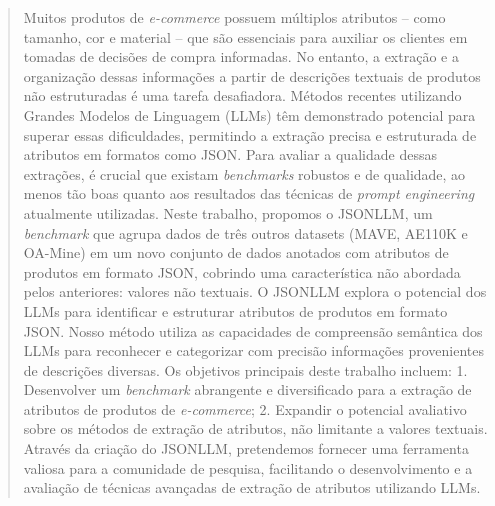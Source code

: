 



\maketitle




\begin{abstract} %
  Muitos produtos de \textit{e-commerce} possuem múltiplos atributos -- como tamanho, cor e material -- que são essenciais para auxiliar os clientes em tomadas de decisões de compra informadas. No entanto, a extração e a organização dessas informações a partir de descrições textuais de produtos não estruturadas é uma tarefa desafiadora. Métodos recentes utilizando Grandes Modelos de Linguagem (LLMs) têm demonstrado potencial para superar essas dificuldades, permitindo a extração precisa e estruturada de atributos em formatos como JSON. Para avaliar a qualidade dessas extrações, é crucial que existam \textit{benchmarks} robustos e de qualidade, ao menos tão boas quanto aos resultados das técnicas de \textit{prompt engineering} atualmente utilizadas.
  Neste trabalho, propomos o JSONLLM, um \textit{benchmark} que agrupa dados de três outros datasets (MAVE, AE110K e OA-Mine) em um novo conjunto de dados anotados com atributos de produtos em formato JSON, cobrindo uma característica não abordada pelos anteriores: valores não textuais. O JSONLLM explora o potencial dos LLMs para identificar e estruturar atributos de produtos em formato JSON. Nosso método utiliza as capacidades de compreensão semântica dos LLMs para reconhecer e categorizar com precisão informações provenientes de descrições diversas.
  Os objetivos principais deste trabalho incluem: 1. Desenvolver um \textit{benchmark} abrangente e diversificado para a extração de atributos de produtos de \textit{e-commerce}; 2. Expandir o potencial avaliativo sobre os métodos de extração de atributos, não limitante a valores textuais.
  Através da criação do JSONLLM, pretendemos fornecer uma ferramenta valiosa para a comunidade de pesquisa, facilitando o desenvolvimento e a avaliação de técnicas avançadas de extração de atributos utilizando LLMs.
\end{abstract}

